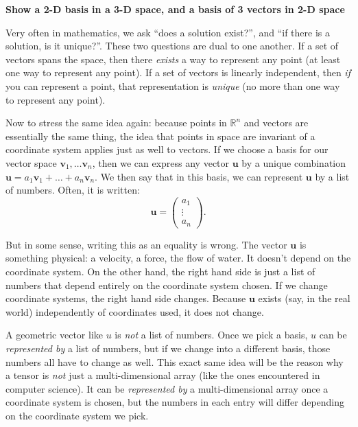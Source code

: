 	\textbf{Show a 2-D basis in a 3-D space, and a basis of 3 vectors in 2-D space}

	Very often in mathematics, we ask ``does a solution exist?'', and ``if there is a solution, is it unique?''. These two questions are dual to one another. If a set of vectors spans the space, then there \emph{exists} a way to represent any point (at least one way to represent any point). If a set of vectors is linearly independent, then \emph{if} you can represent a point, that representation is \emph{unique} (no more than one way to represent any point).
	
	Now to stress the same idea again: because points in $\mathbb R^n$ and vectors are essentially the same thing, the idea that points in space are invariant of a coordinate system applies just as well to vectors. If we choose a basis for our vector space $\mathbf v_1, \dots \mathbf v_n$, then we can express any vector $\mathbf u$ by a unique combination $\mathbf u = a_1 \mathbf v_1 + \dots + a_n \mathbf v_n$. We then say that in this basis, we can represent $\mathbf u$ by a list of numbers. Often, it is written:
	\begin{equation*}
		\mathbf u = \begin{pmatrix} a_1 \\ \vdots \\a_n	\end{pmatrix}.
	\end{equation*}
	
	But in some sense, writing this as an equality is wrong. The vector $\mathbf u$ is something physical: a velocity, a force, the flow of water. It doesn't depend on the coordinate system. On the other hand, the right hand side is just a list of numbers that depend entirely on the coordinate system chosen. If we change coordinate systems, the right hand side changes. Because $\mathbf u$ exists (say, in the real world) independently of coordinates used, it does not change.
	
	A geometric vector like $u$ is \emph{not} a list of numbers. Once we pick a basis, $u$ can be \emph{represented by} a list of numbers, but if we change into a different basis, those numbers all have to change as well. This exact same idea will be the reason why a tensor is \emph{not} just a multi-dimensional array (like the ones encountered in computer science). It can be \emph{represented by} a multi-dimensional array once a coordinate system is chosen, but the numbers in each entry will differ depending on the coordinate system we pick. 
	
